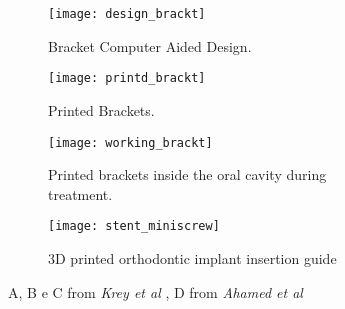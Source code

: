 \begin{figure}[h!]
\begin{subfigure}{0.5\textwidth}
\centering
\texttt{[image: design\_brackt]} 
\caption{Bracket Computer Aided Design.}
\label{fig:design_brackt}
\end{subfigure}
\begin{subfigure}{0.5\textwidth}
\centering
\texttt{[image: printd\_brackt]}
\caption{Printed Brackets.}
\label{fig:printd_brackt}
\end{subfigure}
\begin{subfigure}{0.5\textwidth}
\centering
\texttt{[image: working\_brackt]}
\caption{Printed brackets inside the oral cavity during treatment.}
\label{fig:working_brackt}
\end{subfigure}
\begin{subfigure}{0.5\textwidth}
\centering
\texttt{[image: stent\_miniscrew]}
\caption{3D printed orthodontic implant insertion guide}
\label{fig:stent_miniscrew}
\end{subfigure}
\caption{A, B e C from \emph{Krey et al} \parencite{Reference115}, D from \emph{Ahamed et al} \parencite{Reference116}}
\label{fig:3d_ortho}
\end{figure}

